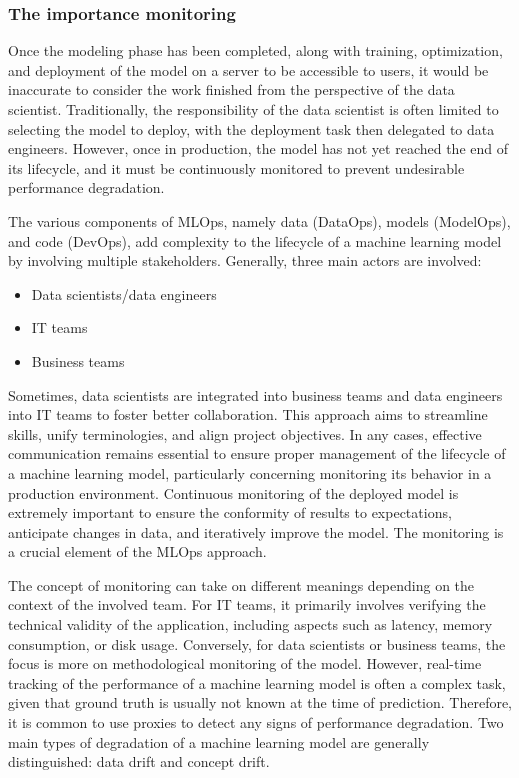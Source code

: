 \subsubsection{The importance monitoring}

Once the modeling phase has been completed, along with training, optimization, and deployment of the model on a server to be accessible to users, it would be inaccurate to consider the work finished from the perspective of the data scientist. Traditionally, the responsibility of the data scientist is often limited to selecting the model to deploy, with the deployment task then delegated to data engineers. However, once in production, the model has not yet reached the end of its lifecycle, and it must be continuously monitored to prevent undesirable performance degradation.

The various components of MLOps, namely data (DataOps), models (ModelOps), and code (DevOps), add complexity to the lifecycle of a machine learning model by involving multiple stakeholders. Generally, three main actors are involved:

\begin{itemize}
    \item Data scientists/data engineers
    \item IT teams
    \item Business teams
\end{itemize}

Sometimes, data scientists are integrated into business teams and data engineers into IT teams to foster better collaboration. This approach aims to streamline skills, unify terminologies, and align project objectives. In any cases, effective communication remains essential to ensure proper management of the lifecycle of a machine learning model, particularly concerning monitoring its behavior in a production environment. Continuous monitoring of the deployed model is extremely important to ensure the conformity of results to expectations, anticipate changes in data, and iteratively improve the model. The monitoring is a crucial element of the MLOps approach.

The concept of monitoring can take on different meanings depending on the context of the involved team. For IT teams, it primarily involves verifying the technical validity of the application, including aspects such as latency, memory consumption, or disk usage. Conversely, for data scientists or business teams, the focus is more on methodological monitoring of the model. However, real-time tracking of the performance of a machine learning model is often a complex task, given that ground truth is usually not known at the time of prediction. Therefore, it is common to use proxies to detect any signs of performance degradation. Two main types of degradation of a machine learning model are generally distinguished: data drift and concept drift.

